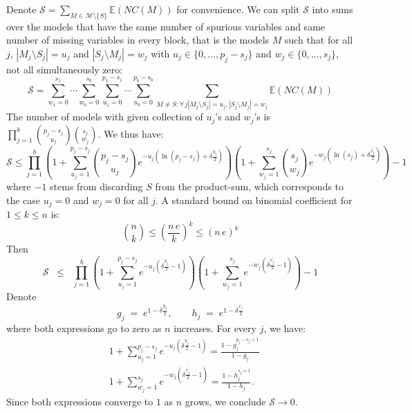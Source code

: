 \documentclass[aos]{imsart}
\theoremstyle{plain}
\newcommand{\E}{\mathbb{E}}
\begin{document}
\begin{supplement}
Denote $\mathcal{S}= \sum_{M \in \mathcal{M}\setminus \{S\}} \E\left(NC(M)\right)$ for convenience. We can split $\mathcal{S}$ into sums over the models that have the same number of spurious variables and same number of missing variables in every block, that is the models $M$ such that for all $j$, $|M_j\setminus S_j|=u_j$ and $|S_j\setminus M_j|=w_j$ with $u_j \in \{0,\ldots,p_j-s_j\}$ and $w_j \in \{0,\ldots,s_j\}$, not all simultaneously zero:
$$\mathcal{S} =\sum_{w_1=0}^{s_1}\cdots\sum_{w_b=0}^{s_b}\sum_{u_1=0}^{p_1-s_1}\cdots\sum_{u_b=0}^{p_b-s_b}\sum_{M \neq S:\forall \,j |M_j\setminus S_j|=u_j, |S_j\setminus M_j|=w_j } \E\left(NC(M)\right)$$
The number of models with given collection of $u_j$'s and $w_j$'s is $\prod_{j=1}^b {p_j-s_j \choose u_j}{s_j \choose w_j}$. We thus have:
\begin{equation*}
    \mathcal{S} \leq \prod_{j=1}^b\left(1+\sum_{u_j=1}^{p_j-s_j}{p_j-s_j \choose u_j}e^{- u_j(\ln(p_j-s_j)+\delta \tfrac{b_j}{2})}\right)\left(1+
    \sum_{w_j=1}^{s_j}{s_j \choose w_j}
    e^{-w_j(\ln(s_j)+\delta \tfrac{c^{\prime}_j}{2})}\right) - 1
\end{equation*}
where $-1$ stems from discarding $S$ from the product-sum, which corresponds to the case $u_j=0$ and $w_j=0$ for all $j$. A standard bound on binomial coefficient for $1\leq k\leq n$ is:
\begin{equation*}
    {n \choose k} \leq \left(\frac{n\,e}{k}\right)^k \leq \left(n\,e\right)^k
\end{equation*}
Then
\begin{equation*}
    \mathcal{S} \;\;\leq\;\; \prod_{j=1}^b\left(1+\sum_{u_j=1}^{p_j-s_j}e^{-u_j\left(\delta \tfrac{b_j}{2}-1\right)}\right)\left(1+
    \sum_{w_j=1}^{s_j}    e^{-w_j\left(\delta \tfrac{c^{\prime}_j}{2}-1\right)}\right) - 1
\end{equation*}
Denote
$$
g_j\;=\;e^{1-\delta \tfrac{b_j}{2}},\qquad h_j\;=\;e^{1-\delta \tfrac{c^{\prime}_j}{2}}
$$
where both expressions go to zero as $n$ increases.
For every $j$, we have:
\begin{align*}
    &1+\sum_{u_j=1}^{p_j-s_j}e^{-u_j\left(\delta \tfrac{b_j}{2}-1\right)}
    =\frac{1-g_j^{p_j-s_j+1}}{1-g_j} \\
    &1+\sum_{w_j=1}^{s_j}    e^{-w_j\left(\delta \tfrac{c^{\prime}_j}{2}-1\right)} =\frac{1-h_j^{s_j+1}}{1-h_j}.
\end{align*}
Since both expressions converge to $1$ as $n$ grows, we conclude $\mathcal S\to 0$.


\end{supplement}
\end{document}
